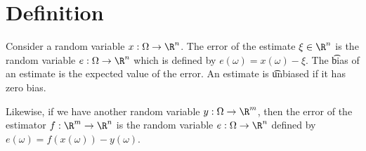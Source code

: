 
\section*{Definition}

Consider a random variable $x: \Omega  \to \R ^n$.
The error of the estimate $\xi  \in \R ^n$ is the random variable $e: \Omega  \to \R ^n$ which is defined by $e(\omega ) = x(\omega ) - \xi $.
The \t{bias} of an estimate is the expected value of the error.
An estimate is \t{unbiased} if it has zero bias.

Likewise, if we have another random variable $y: \Omega  \to \R ^m$, then the error of the estimator $f: \R ^m \to \R ^n$ is the random variable $e: \Omega  \to \R ^n$ defined by $e(\omega ) = f(x(\omega )) - y(\omega )$.

\blankpage